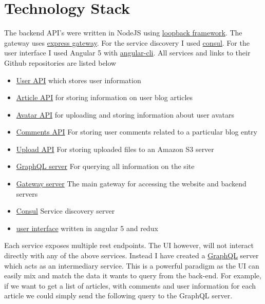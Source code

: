\section{Technology Stack}

The backend API's were written in NodeJS using \href{https://loopback.io}{loopback framework}. The gateway uses \href{https://www.express-gateway.io/}{express gateway}. For the service discovery I used \href{https://www.consul.io/}{consul}. For the user interface I used Angular 5 with \href{https://cli.angular.io/}{angular-cli}. All services and links to their Github repositories are listed below

\begin{itemize}
  \item \href{https://github.com/msc-blog-assignment/msc-blog-user-api}{User API} which stores user information
  \item \href{https://github.com/msc-blog-assignment/msc-blog-article-api}{Article API} for storing information on user blog articles
  \item \href{https://github.com/msc-blog-assignment/msc-blog-avatar-api}{Avatar API} for uploading and storing information about user avatars
  \item \href{https://github.com/msc-blog-assignment/msc-blog-comments-api}{Comments API} For storing user comments related to a particular blog entry
  \item \href{https://github.com/msc-blog-assignment/msc-blog-upload-api}{Upload API} For storing uploaded files to an Amazon S3 server
  \item \href{https://github.com/msc-blog-assignment/msc-blog-graphql}{GraphQL server} For querying all information on the site
  \item \href{https://github.com/msc-blog-assignment/msc-blog-gateway}{Gateway server} The main gateway for accessing the website and backend servers
  \item \href{https://github.com/msc-blog-assignment/msc-blog-consul}{Consul} Service discovery server
  \item \href{https://github.com/msc-blog-assignment/msc-blog-ui}{user interface} written in angular 5 and redux
\end{itemize}
Each service exposes multiple rest endpoints. The UI however, will not interact directly with any of the above services. Instead I have created a \href{https://graphql.org/learn/}{GraphQL} server which acts as an intermediary service. This is a powerful paradigm as the UI can easily mix and match the data it wants to query from the back-end. For example, if we want to get a list of articles, with comments and user information for each article we could simply send the following query to the GraphQL server.

